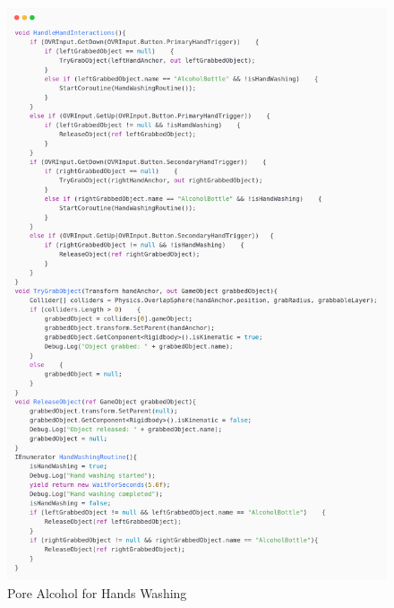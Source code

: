 \newpage
{}
\newline
\begin{figure}[h]
	\centering
	\includegraphics[width=1\textwidth, height=0.7\textheight]{Images/pore alcohol1.png}
	\caption{Pore Alcohol for Hands Washing}
	\label{fig:Grabbing-Tool}
\end{figure}
\newpage
{}
\newline
